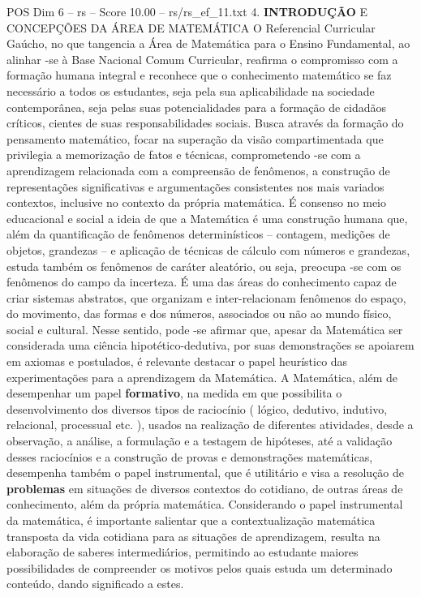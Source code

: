 \begin{textsample}{POS Dim 6 – rs – Score 10.00 – rs/rs\_ef\_11.txt}  \label{ex:f6_pos_182}
4. \textbf{INTRODUÇÃO} E CONCEPÇÕES DA ÁREA DE MATEMÁTICA O Referencial Curricular Gaúcho, no que tangencia a Área de Matemática para o Ensino Fundamental, ao alinhar -se à Base Nacional Comum Curricular, reafirma o compromisso com a formação humana integral e reconhece que o conhecimento matemático se faz necessário a todos os estudantes, seja pela sua aplicabilidade na sociedade contemporânea, seja pelas suas potencialidades para a formação de cidadãos críticos, cientes de suas responsabilidades sociais.
Busca através da formação do pensamento matemático, focar na superação da visão compartimentada que privilegia a memorização de fatos e técnicas, comprometendo -se com a aprendizagem relacionada com a compreensão de fenômenos, a construção de representações significativas e argumentações consistentes nos mais variados contextos, inclusive no contexto da própria matemática.
É consenso no meio educacional e social a ideia de que a Matemática é uma construção humana que, além da quantificação de fenômenos determinísticos – contagem, medições de objetos, grandezas – e aplicação de técnicas de cálculo com números e grandezas, estuda também os fenômenos de caráter aleatório, ou seja, preocupa -se com os fenômenos do campo da incerteza.
É uma das áreas do conhecimento capaz de criar sistemas abstratos, que organizam e inter-relacionam fenômenos do espaço, do movimento, das formas e dos números, associados ou não ao mundo físico, social e cultural.
Nesse sentido, pode -se afirmar que, apesar da Matemática ser considerada uma ciência hipotético-dedutiva, por suas demonstrações se apoiarem em axiomas e postulados, é relevante destacar o papel heurístico das experimentações para a aprendizagem da Matemática.
A Matemática, além de desempenhar um papel \textbf{formativo}, na medida em que possibilita o desenvolvimento dos diversos tipos de raciocínio ( lógico, dedutivo, indutivo, relacional, processual etc. ), usados na realização de diferentes atividades, desde a observação, a análise, a formulação e a testagem de hipóteses, até a validação desses raciocínios e a construção de provas e demonstrações matemáticas, desempenha também o papel instrumental, que é utilitário e visa a resolução de \textbf{problemas} em situações de diversos contextos do cotidiano, de outras áreas de conhecimento, além da própria matemática.
Considerando o papel instrumental da matemática, é importante salientar que a contextualização matemática transposta da vida cotidiana para as situações de aprendizagem, resulta na elaboração de saberes intermediários, permitindo ao estudante maiores possibilidades de compreender os motivos pelos quais estuda um determinado conteúdo, dando significado a estes.

\end{textsample}
